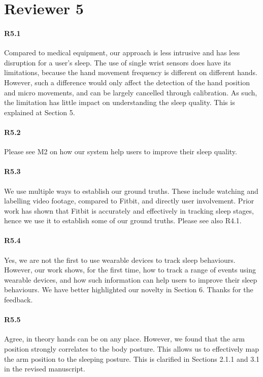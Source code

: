 \section*{Reviewer 5}

\paragraph{R5.1} Compared to medical equipment, our approach is less intrusive and has less disruption for a user's sleep. The use of
single wrist sensors does have its limitations, because the hand movement frequency is different on different hands. However, such a
difference would only affect the detection of the hand position and micro movements, and can be largely cancelled through calibration. As
such, the limitation has little impact on understanding the sleep quality. This is explained at Section 5.


\paragraph{R5.2} Please see M2 on how our system help users to improve their sleep quality.

\paragraph{R5.3} We use multiple ways to establish our ground truths. These include watching and labelling video footage, compared to
Fitbit, and directly user involvement. Prior work has shown that Fitbit is accurately and effectively in tracking sleep stages, hence we use it to
establish some of our ground truths. Please see also R4.1.

\paragraph{R5.4} Yes, we are not the first to use wearable devices to track sleep behaviours. However, our work shows, for the first time, how
 to track a range of events using wearable devices, and how such information can help users to improve
their sleep behaviours. We have better highlighted our novelty in Section 6. Thanks for the feedback.

\paragraph{R5.5} Agree, in theory hands can be on any place. However, we found that the arm position strongly correlates to the body
posture. This allows us to effectively map the arm position to the sleeping posture. This is clarified in Sections 2.1.1 and 3.1 in the
revised manuscript.

